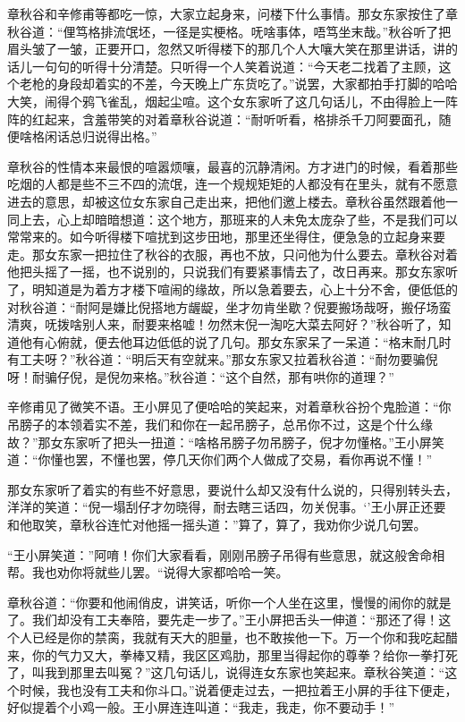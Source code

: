 \documentclass[12pt,UTF8]{ctexbook}
\begin{document}
{{{章秋谷和辛修甫等都吃一惊，大家立起身来，问楼下什么事情。那女东家按住了章秋谷道：“俚笃格排流氓坯，一径是实梗格。呒啥事体，唔笃坐末哉。”秋谷听了把眉头皱了一皱，正要开口，忽然又听得楼下的那几个人大嚷大笑在那里讲话，讲的话儿一句句的听得十分清楚。只听得一个人笑着说道：“今天老二找着了主顾，这个老枪的身段却着实的不差，今天晚上广东货吃了。”说罢，大家都拍手打脚的哈哈大笑，闹得个鸦飞雀乱，烟起尘喧。这个女东家听了这几句话儿，不由得脸上一阵阵的红起来，含羞带笑的对着章秋谷说道：“耐听听看，格排杀千刀阿要面孔，随便啥格闲话总归说得出格。”

章秋谷的性情本来最恨的喧嚣烦嚷，最喜的沉静清闲。方才进门的时候，看着那些吃烟的人都是些不三不四的流氓，连一个规规矩矩的人都没有在里头，就有不愿意进去的意思，却被这位女东家自己走出来，把他们邀上楼去。章秋谷虽然跟着他一同上去，心上却暗暗想道：这个地方，那班来的人未免太庞杂了些，不是我们可以常常来的。如今听得楼下喧扰到这步田地，那里还坐得住，便急急的立起身来要走。那女东家一把拉住了秋谷的衣服，再也不放，只问他为什么要去。章秋谷对着他把头摇了一摇，也不说别的，只说我们有要紧事情去了，改日再来。那女东家听了，明知道是为着方才楼下喧闹的缘故，所以急着要去，心上十分不舍，便低低的对秋谷道：“耐阿是嫌比倪搭地方龌龊，坐才勿肯坐歇？倪要搬场哉呀，搬仔场蛮清爽，呒拨啥别人来，耐要来格嘘！勿然末倪一淘吃大菜去阿好？”秋谷听了，知道他有心俯就，便去他耳边低低的说了几句。那女东家呆了一呆道：“格末耐几时有工夫呀？”秋谷道：“明后天有空就来。”那女东家又拉着秋谷道：“耐勿要骗倪呀！耐骗仔倪，是倪勿来格。”秋谷道：“这个自然，那有哄你的道理？”

辛修甫见了微笑不语。王小屏见了便哈哈的笑起来，对着章秋谷扮个鬼脸道：“你吊膀子的本领着实不差，我们和你在一起吊膀子，总吊你不过，这是个什么缘故？”那女东家听了把头一扭道：“啥格吊膀子勿吊膀子，倪才勿懂格。”王小屏笑道：“你懂也罢，不懂也罢，停几天你们两个人做成了交易，看你再说不懂！”

那女东家听了着实的有些不好意思，要说什么却又没有什么说的，只得别转头去，洋洋的笑道：“倪一塌刮仔才勿晓得，耐去瞎三话四，勿关倪事。‘’王小屏正还要和他取笑，章秋谷连忙对他摇一摇头道：”算了，算了，我劝你少说几句罢。

“王小屏笑道：”阿唷！你们大家看看，刚刚吊膀子吊得有些意思，就这般舍命相帮。我也劝你将就些儿罢。“说得大家都哈哈一笑。

章秋谷道：“你要和他闹俏皮，讲笑话，听你一个人坐在这里，慢慢的闹你的就是了。我们却没有工夫奉陪，要先走一步了。”王小屏把舌头一伸道：“那还了得！这个人已经是你的禁脔，我就有天大的胆量，也不敢挨他一下。万一个你和我吃起醋来，你的气力又大，拳棒又精，我区区鸡肋，那里当得起你的尊拳？给你一拳打死了，叫我到那里去叫冤？”这几句话儿，说得连女东家也笑起来。章秋谷笑道：“这个时候，我也没有工夫和你斗口。”说着便走过去，一把拉着王小屏的手往下便走，好似提着个小鸡一般。王小屏连连叫道：“我走，我走，你不要动手！”

}}}
\end{document}
